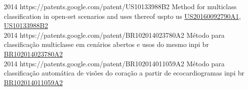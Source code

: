 \begin{publications}
  {
  }
  {2014}
  {https://patents.google.com/patent/US10133988B2}
  {Method for multiclass classification in open-set scenarios and uses thereof}
  {uspto}
  {us}
  {\href{https://patents.google.com/patent/US20160092790A1}{US20160092790A1}, \href{https://patents.google.com/patent/US10133988B2}{US10133988B2}}
  {}
  {}
  {}
  \\

  {
  }
  {2014}
  {https://patents.google.com/patent/BR102014023780A2}%
  {Método para classificação multiclasse em cenários abertos e usos do mesmo}
  {inpi}
  {br}
  {\href{https://patents.google.com/patent/BR102014023780A2}{BR102014023780A2}}
  {}
  {}
  {}
  \\

  {
  }
  {2014}
  {https://patents.google.com/patent/BR102014011059A2}
  {Método para classificação automática de visões do coração a partir de ecocardiogramas}
  {inpi}
  {br}
  {\href{https://patents.google.com/patent/BR102014011059A2}{BR102014011059A2}}
  {}
  {}
  {}
  \\

\end{publications}






